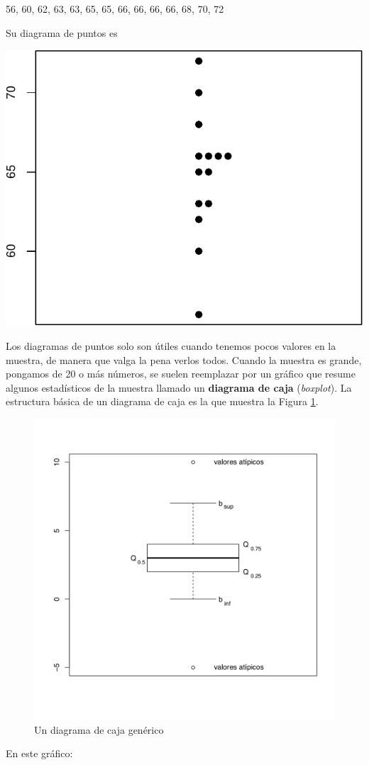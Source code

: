 \documentclass[
]{book}
\theoremstyle{definition}
\theoremstyle{definition}
\theoremstyle{definition}
\theoremstyle{definition}
\theoremstyle{remark}
\begin{document}
56, 60, 62, 63, 63, 65, 65, 66, 66, 66, 66, 68, 70, 72

Su diagrama de puntos es

\begin{center}\includegraphics[width=0.5\linewidth]{INREMDN_files/figure-latex/unnamed-chunk-272-1} \end{center}

Los diagramas de puntos solo son útiles cuando tenemos pocos valores en la muestra, de manera que valga la pena verlos todos. Cuando la muestra es grande, pongamos de 20 o más números, se suelen reemplazar por un gráfico que resume algunos estadísticos de la muestra llamado un \textbf{diagrama de caja} (\emph{boxplot}). La estructura básica de un diagrama de caja es la que muestra la Figura \ref{fig:bosplotgen}.

\begin{figure}

{\centering \includegraphics[width=0.6\linewidth]{INREMDN_files/figure-html/boxplotgen} 

}

\caption{Un diagrama de caja genérico}\label{fig:bosplotgen}
\end{figure}

En este gráfico:
\end{document}
